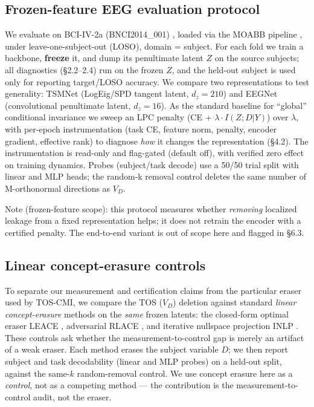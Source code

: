\subsection{Frozen-feature EEG evaluation protocol}
We evaluate on BCI-IV-2a (BNCI2014\_001) \citep{brunner2008bci}, loaded via the MOABB pipeline
\citep{jayaram2018moabb}, under leave-one-subject-out (LOSO), domain = subject. For each
fold we train a backbone, \textbf{freeze} it, and dump its penultimate latent $Z$ on the source subjects; all
diagnostics (\S2.2--2.4) run on the frozen $Z$, and the held-out subject is used only for reporting target/LOSO
accuracy. We compare two representations to test generality: TSMNet \citep{kobler2022spd} (LogEig/SPD tangent
latent, $d_z=210$) and EEGNet \citep{lawhern2018eegnet} (convolutional penultimate latent, $d_z=16$). As the standard baseline for ``global'' conditional
invariance we sweep an LPC penalty (CE + $\lambda \cdot I(Z;D|Y)$) over $\lambda$, with per-epoch instrumentation (task CE,
feature norm, penalty, encoder gradient, effective rank) to diagnose \emph{how} it changes the representation
(\S4.2). The instrumentation is read-only and flag-gated (default off), with verified zero effect on
training dynamics. Probes (subject/task decode) use a 50/50 trial split with linear and MLP heads; the
random-k removal control deletes the same number of M-orthonormal directions as $V_D$.

Note (frozen-feature scope): this protocol measures whether \emph{removing} localized leakage from a fixed
representation helps; it does not retrain the encoder with a certified penalty. The end-to-end variant is
out of scope here and flagged in \S6.3.

\subsection{Linear concept-erasure controls}
To separate our measurement and certification claims from the particular eraser used by TOS-CMI, we compare
the TOS ($V_D$) deletion against standard \emph{linear concept-erasure} methods on the \emph{same} frozen
latents: the closed-form optimal eraser LEACE \citep{belrose2023leace}, adversarial RLACE
\citep{ravfogel2022rlace}, and iterative nullspace projection INLP \citep{ravfogel2020inlp}. These controls
ask whether the measurement-to-control gap is merely an artifact of a weak eraser. Each method erases the
subject variable $D$; we then report subject and task decodability (linear and MLP probes) on a held-out
split, against the same-$k$ random-removal control. We use concept erasure here as a \emph{control}, not as
a competing method --- the contribution is the measurement-to-control audit, not the eraser.

